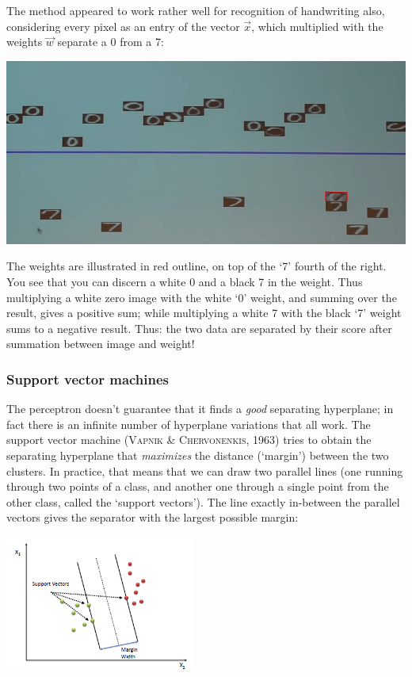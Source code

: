 \documentclass{article}
\begin{document}
\begin{testexample}
    The method appeared to work rather well for recognition of handwriting also, considering every pixel as an entry of the vector $\vec{x}$, which multiplied with the weights $\vec{w}$ separate a 0 from a 7:
    \begin{center}\includegraphics[width=1\textwidth]{numberrecog.png}\end{center}
    The weights are illustrated in red outline, on top of the `7' fourth of the right. You see that you can discern a white 0 and a black 7 in the weight. Thus multiplying a white zero image with the white `0' weight, and summing over the result, gives a positive sum; while multiplying a white 7 with the black `7' weight sums to a negative result. Thus: the two data are separated by their score after summation between image and weight!
\end{testexample}



\subsubsection{Support vector machines}
The perceptron doesn't guarantee that it finds a \textit{good} separating hyperplane; in fact there is an infinite number of hyperplane variations that all work. The support vector machine (\textsc{Vapnik \& Chervonenkis}, 1963) tries to obtain the separating hyperplane that \textit{maximizes} the distance (`margin') between the two clusters. In practice, that means that we can draw two parallel lines (one running through two points of a class, and another one through a single point from the other class, called the `support vectors'). The line exactly in-between the parallel vectors gives the separator with the largest possible margin:
\begin{center}\includegraphics[width=0.47\textwidth]{SVM.png}\end{center}
\end{document}
